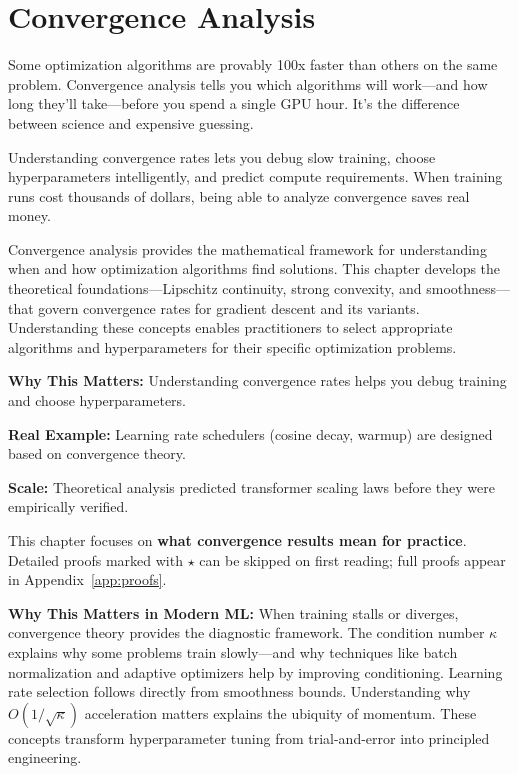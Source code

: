 \documentclass[../../main.tex]{subfiles}
\begin{document}
\chapter{Convergence Analysis}
\label{ch:convergence-analysis}

Some optimization algorithms are provably 100x faster than others on the same problem. Convergence analysis tells you which algorithms will work---and how long they'll take---before you spend a single GPU hour. It's the difference between science and expensive guessing.

\begin{whycare}
Understanding convergence rates lets you debug slow training, choose hyperparameters intelligently, and predict compute requirements. When training runs cost thousands of dollars, being able to analyze convergence saves real money.
\end{whycare}

\begin{keyconcept}
Convergence analysis provides the mathematical framework for understanding when and how optimization algorithms find solutions. This chapter develops the theoretical foundations---Lipschitz continuity, strong convexity, and smoothness---that govern convergence rates for gradient descent and its variants. Understanding these concepts enables practitioners to select appropriate algorithms and hyperparameters for their specific optimization problems.
\end{keyconcept}

\begin{realworld}
\textbf{Why This Matters:} Understanding convergence rates helps you debug training and choose hyperparameters.

\textbf{Real Example:} Learning rate schedulers (cosine decay, warmup) are designed based on convergence theory.

\textbf{Scale:} Theoretical analysis predicted transformer scaling laws before they were empirically verified.
\end{realworld}

\begin{principle}
This chapter focuses on \textbf{what convergence results mean for practice}. Detailed proofs marked with $\star$ can be skipped on first reading; full proofs appear in Appendix~\ref{app:proofs}.
\end{principle}

\begin{keyconcept}
\textbf{Why This Matters in Modern ML:}
When training stalls or diverges, convergence theory provides the diagnostic framework. The condition number $\kappa$ explains why some problems train slowly---and why techniques like batch normalization and adaptive optimizers help by improving conditioning. Learning rate selection follows directly from smoothness bounds. Understanding why $O(1/\sqrt{\kappa})$ acceleration matters explains the ubiquity of momentum. These concepts transform hyperparameter tuning from trial-and-error into principled engineering.
\end{keyconcept}
\end{document}
